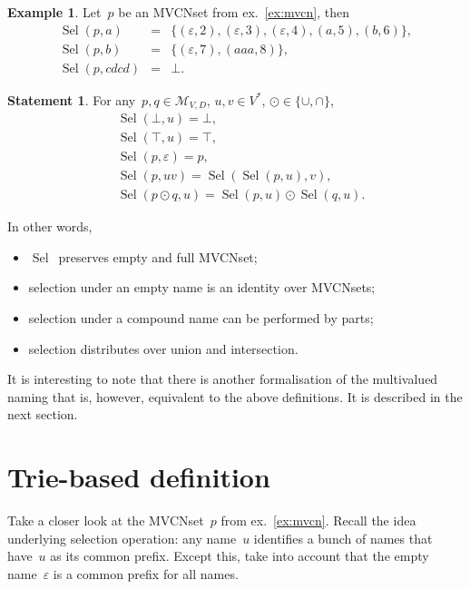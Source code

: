 \documentclass{article}
\theoremstyle{definition}
\newtheorem{St}{Statement}
\newtheorem{Ex}{Example}
\newcommand{\setcharmvcn}{M}
\newcommand{\setsymbol}[3]{\mathcal{#1}_{#2,#3}}
\newcommand{\setmvcn}[2]{\setsymbol{\setcharmvcn}{#1}{#2}}
\newcommand{\select}{\operatorname{Sel}}
\begin{document}
\begin{Ex}\label{ex:mvcn-select}
Let~$p$ be an MVCNset from ex.~\ref{ex:mvcn}, then
\begin{eqnarray*}
  \select(p, a) & = & \{
    (\varepsilon, 2),
    (\varepsilon, 3),
    (\varepsilon, 4),
    (a,           5),
    (b,           6)
  \} , \\
  \select(p, b) & = & \{
    (\varepsilon, 7),
    (aaa,         8)
  \} , \\
  \select(p, cdcd) & = & \bot .
\end{eqnarray*}
\end{Ex}

\begin{St}\label{st:mvcn-selection-properties}
For any~$p,q\in\setmvcn{V}{D}$, $u, v\in V^\ast$, $\odot\in\{\cup, \cap\}$,
\begin{eqnarray*}
  & \select(\bot,u) = \bot, \\
  & \select(\top,u) = \top, \\
  & \select(p,\varepsilon) = p, \\
  & \select(p,uv) = \select(\select(p,u), v), \\
  & \select(p\odot q, u) = \select(p,u)\odot \select(q,u).
\end{eqnarray*}
\end{St}
In other words,
\begin{itemize}
\item $\select$~preserves empty and full MVCNset;
\item selection under an empty name is an identity over MVCNsets;
\item selection under a compound name can be performed by parts;
\item selection distributes over union and intersection.
\end{itemize}

It is interesting to note that there is another formalisation of the
multivalued naming that is, however, equivalent to the above definitions.  It
is described in the next section.



\section{Trie-based definition}

Take a closer look at the MVCNset~$p$ from ex.~\ref{ex:mvcn}.
Recall the
idea underlying selection operation: any name~$u$ identifies a bunch of
names that have~$u$ as its common prefix. Except this, take into account that
the empty name~$\varepsilon$ is a common prefix for all names.
\end{document}

